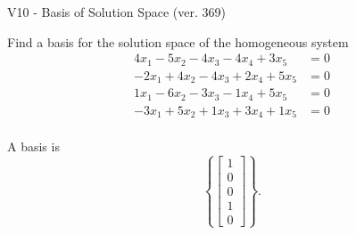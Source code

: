 \begin{exercise}
  \begin{exerciseTitle}V10 - Basis of Solution Space (ver. 369)\end{exerciseTitle}
  \begin{exerciseStatement}
    Find a basis for the solution space of the homogeneous system 
\begin{align*}
 4 x_ 1 -5 x_ 2 -4 x_ 3 -4 x_ 4 + 3 x_ 5 &= 0  \\ 
  -2 x_ 1 + 4 x_ 2 -4 x_ 3 + 2 x_ 4 + 5 x_ 5 &= 0  \\ 
  1 x_ 1 -6 x_ 2 -3 x_ 3 -1 x_ 4 + 5 x_ 5 &= 0  \\ 
  -3 x_ 1 + 5 x_ 2 + 1 x_ 3 + 3 x_ 4 + 1 x_ 5 &= 0  \\ 
 \end{align*}


 
  \end{exerciseStatement}

  \begin{exerciseAnswer}
   A basis is   
\[\left\{\left[\begin{array}{c}
1 \\
0 \\
0 \\
1 \\
0
\end{array}\right]\right\}.\]

  


  \end{exerciseAnswer}
\end{exercise}